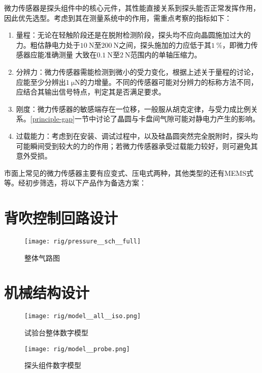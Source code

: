 微力传感器是探头组件中的核心元件，其性能直接关系到探头能否正常发挥作用，因此优先选型。考虑到其在测量系统中的作用，需重点考察的指标如下：

\begin{enumerate}
  \item
    量程：无论在轻触阶段还是在脱附检测阶段，探头均不应向晶圆施加过大的力。粗估静电力处于$\SI{10}{\newton}$至$\SI{200}{\newton}$之间，探头施加的力应低于其$1 ~\%$，即微力传感器应能准确测量 大致在$\SI{0.1}{\newton}$至$\SI{2}{\newton}$范围内的单轴压缩力。
  \item
    分辨力：微力传感器需能检测到微小的受力变化，根据上述关于量程的讨论，应能至少分辨出$\SI{1}{\micro\newton}$的力增量。不同的传感器可能对分辨力的标称方法不同，应结合其输出信号特点，判定其是否满足要求。
  \item
    刚度：微力传感器的敏感端存在一位移，一般服从胡克定律，与受力成比例关系。\ref{principle-gap}一节中讨论了晶圆与卡盘间气隙可能对静电力产生的影响。
  \item
    过载能力：考虑到在安装、调试过程中，以及硅晶圆突然完全脱附时，探头均可能瞬间受到较大的力的作用；若微力传感器承受过载能力较好，则可避免其意外受损。
\end{enumerate}

市面上常见的微力传感器主要有应变式、压电式两种，其他类型的还有MEMS式等。经初步筛选，将以下产品作为备选方案：








\section{背吹控制回路设计}\label{sec:rig-pressure}

\begin{figure}[tbh]
\centering
\texttt{[image: rig/pressure\_\_sch\_\_full]}
\caption{整体气路图}
\label{fig:rig-pressure-sch-full}
\end{figure}



\section{机械结构设计}\label{sec:rig-model}

\begin{figure}[p]
\centering
\texttt{[image: rig/model\_\_all\_\_iso.png]}
\caption{试验台整体数字模型}
\label{fig:rig-model-all-iso}
\end{figure}

\begin{figure}[tbhp]
\centering
\texttt{[image: rig/model\_\_probe.png]}
\caption{探头组件数字模型}
\label{fig:rig-model-probe}
\end{figure}


